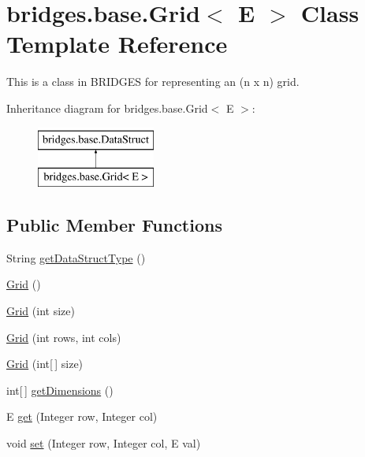 \hypertarget{classbridges_1_1base_1_1_grid}{}\section{bridges.\+base.\+Grid$<$ E $>$ Class Template Reference}
\label{classbridges_1_1base_1_1_grid}


This is a class in B\+R\+I\+D\+G\+E\+S for representing an (n x n) grid.  


Inheritance diagram for bridges.\+base.\+Grid$<$ E $>$\+:\begin{figure}[H]
\begin{center}
\leavevmode
\includegraphics[height=2.000000cm]{classbridges_1_1base_1_1_grid}
\end{center}
\end{figure}
\subsection*{Public Member Functions}
\begin{DoxyCompactItemize}
\item 
String \hyperlink{classbridges_1_1base_1_1_grid_a81f268dd27c292ff2af9358039d4ebe6}{get\+Data\+Struct\+Type} ()
\item 
\hyperlink{classbridges_1_1base_1_1_grid_aa621ffc958db8341f7ce37ed78944d51}{Grid} ()
\item 
\hyperlink{classbridges_1_1base_1_1_grid_a9818d4959813f1292c6a234bc6f6aa9e}{Grid} (int size)
\item 
\hyperlink{classbridges_1_1base_1_1_grid_a43a699bd7ae2c6c986f978c515ff97d8}{Grid} (int rows, int cols)
\item 
\hyperlink{classbridges_1_1base_1_1_grid_ab9975b28d8dda7f3fbe0e35a7a026772}{Grid} (int\mbox{[}$\,$\mbox{]} size)
\item 
int\mbox{[}$\,$\mbox{]} \hyperlink{classbridges_1_1base_1_1_grid_aee8a5b66095d65ff067a4e76f2611b0e}{get\+Dimensions} ()
\item 
E \hyperlink{classbridges_1_1base_1_1_grid_a698579bb5b7166f76a18a1b04916e090}{get} (Integer row, Integer col)
\item 
void \hyperlink{classbridges_1_1base_1_1_grid_ab79ceb737423bb28ea2348e61a625a17}{set} (Integer row, Integer col, E val)
\end{DoxyCompactItemize}

